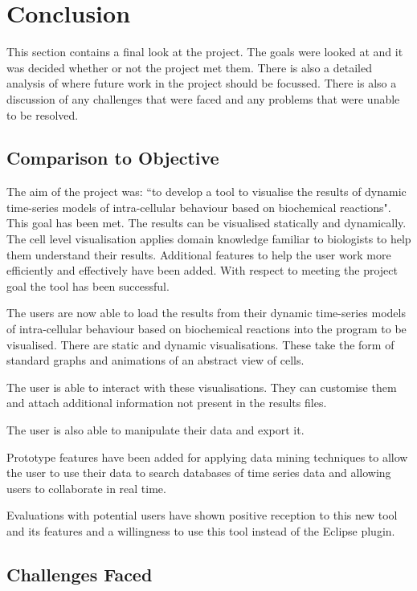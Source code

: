 \chapter{Conclusion}

This section contains a final look at the project.  The goals were looked at and it was decided whether or not the project met them.  There is also a detailed analysis of where future work in the project should be focussed.  There is also a discussion of any challenges that were faced and any problems that were unable to be resolved.

\section{Comparison to Objective}

The aim of the project was: ``to develop a tool to visualise the results of dynamic time-series models of intra-cellular behaviour based on biochemical reactions".  This goal has been met.  The results can be visualised statically and dynamically.  The cell level visualisation applies domain knowledge familiar to biologists to help them understand their results.  Additional features to help the user work more efficiently and effectively have been added.  With respect to meeting the project goal the tool has been successful.

The users are now able to load the results from their dynamic time-series models of intra-cellular behaviour based on biochemical reactions into the program to be visualised.  There are static and dynamic visualisations.  These take the form of standard graphs and animations of an abstract view of cells.

The user is able to interact with these visualisations.  They can customise them and attach additional information not present in the results files.

The user is also able to manipulate their data and export it.

Prototype features have been added for applying data mining techniques to allow the user to use their data to search databases of time series data and allowing users to collaborate in real time.

Evaluations with potential users have shown positive reception to this new tool and its features and a willingness to use this tool instead of the Eclipse plugin.

\section{Challenges Faced}

